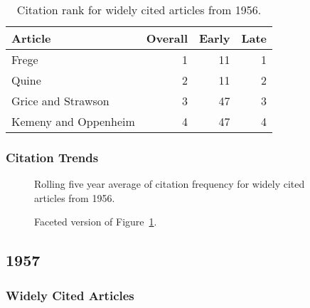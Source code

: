 \documentclass[
  10pt,
  letterpaper,
  DIV=11,
  numbers=noendperiod,
  twoside]{scrartcl}
\begin{document}
\begin{longtable}[]{@{}lrrr@{}}

\caption{\label{tbl-citation-rank-1956}Citation rank for widely cited
articles from 1956.}

\tabularnewline

\toprule\noalign{}
Article & Overall & Early & Late \\
\midrule\noalign{}
\endhead
\bottomrule\noalign{}
\endlastfoot
Frege & 1 & 11 & 1 \\
Quine & 2 & 11 & 2 \\
Grice and Strawson & 3 & 47 & 3 \\
Kemeny and Oppenheim & 4 & 47 & 4 \\

\end{longtable}

\subsubsection*{Citation Trends}\label{sec-trends-1956}

\begin{figure}


\caption{\label{fig-citation-spaghetti-1956}Rolling five year average of
citation frequency for widely cited articles from 1956.}

\end{figure}%

\begin{figure}


\caption{\label{fig-citation-facet-1956}Faceted version of
Figure~\ref{fig-citation-spaghetti-1956}.}

\end{figure}%

\newpage

\subsection{1957}\label{sec-s1957}

\subsubsection*{Widely Cited Articles}\label{widely-cited-articles-1}
\end{document}
